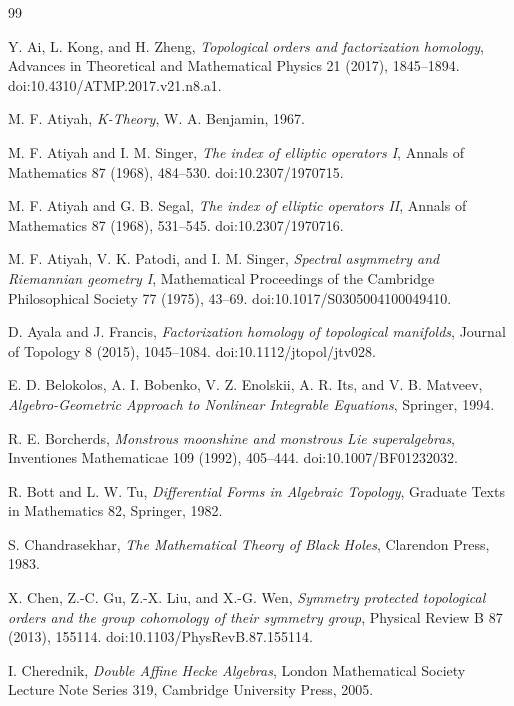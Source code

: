 \documentclass[11pt]{article}
\theoremstyle{definition}
\begin{document}
\begin{thebibliography}{99}

Y. Ai, L. Kong, and H. Zheng,
\emph{Topological orders and factorization homology},
Advances in Theoretical and Mathematical Physics 21 (2017), 1845--1894.
doi:10.4310/ATMP.2017.v21.n8.a1.

M. F. Atiyah,
\emph{K-Theory},
W. A. Benjamin, 1967.

M. F. Atiyah and I. M. Singer,
\emph{The index of elliptic operators I},
Annals of Mathematics 87 (1968), 484--530.
doi:10.2307/1970715.

M. F. Atiyah and G. B. Segal,
\emph{The index of elliptic operators II},
Annals of Mathematics 87 (1968), 531--545.
doi:10.2307/1970716.

M. F. Atiyah, V. K. Patodi, and I. M. Singer,
\emph{Spectral asymmetry and Riemannian geometry I},
Mathematical Proceedings of the Cambridge Philosophical Society 77
(1975), 43--69.
doi:10.1017/S0305004100049410.

D. Ayala and J. Francis,
\emph{Factorization homology of topological manifolds},
Journal of Topology 8 (2015), 1045--1084.
doi:10.1112/jtopol/jtv028.

E. D. Belokolos, A. I. Bobenko, V. Z. Enolskii, A. R. Its, and
V. B. Matveev,
\emph{Algebro-Geometric Approach to Nonlinear Integrable Equations},
Springer, 1994.

R. E. Borcherds,
\emph{Monstrous moonshine and monstrous Lie superalgebras},
Inventiones Mathematicae 109 (1992), 405--444.
doi:10.1007/BF01232032.

R. Bott and L. W. Tu,
\emph{Differential Forms in Algebraic Topology},
Graduate Texts in Mathematics 82, Springer, 1982.

S. Chandrasekhar,
\emph{The Mathematical Theory of Black Holes},
Clarendon Press, 1983.

X. Chen, Z.-C. Gu, Z.-X. Liu, and X.-G. Wen,
\emph{Symmetry protected topological orders and the group cohomology of
their symmetry group},
Physical Review B 87 (2013), 155114.
doi:10.1103/PhysRevB.87.155114.

I. Cherednik,
\emph{Double Affine Hecke Algebras},
London Mathematical Society Lecture Note Series 319,
Cambridge University Press, 2005.


\end{thebibliography}
\end{document}
